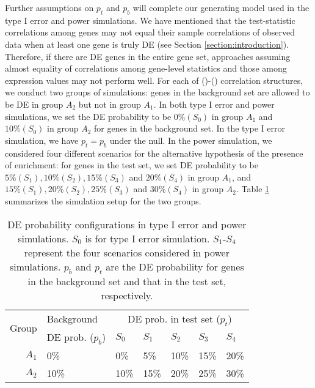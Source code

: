 	Further assumptions on $p_t$ and $p_b$ will complete our generating model used in the type I 
	error and power simulations. %
	We have mentioned that the test-statistic correlations among genes may not equal their sample 
	correlations of observed data when at least one gene is truly DE (see Section 
	\ref{section:introduction}). Therefore, if there are DE genes in the entire gene set, 
	approaches assuming	almost equality of correlations among gene-level statistics and those 
	among expression values may not perform well. For each of (\aaCase)-(\fCase) correlation 
	structures, we conduct two groups of simulations: genes in the background set are allowed to be 
	DE in group $A_2$ but not in group $A_1$.  In both type I error and power 
	simulations, we set the DE probability to be $0\%(S_0)$ in group $A_1$ and $10\%(S_0)$ in group 
	$A_2$ for genes in the background set. In the type I error simulation, we have $p_t = p_b$ 
	under the null. In the power simulation, we considered four different scenarios for the 
	alternative hypothesis of the presence of enrichment: for genes in the test set, we set DE
	probability to be $5\% (S_1), 10\%(S_2), 15\%(S_3)$ and $20\%(S_4)$ in group $A_1$, and 
	$15\%(S_1),	20\%(S_2), 25\%(S_3)$ and $30\%(S_4)$ in group $A_2$. Table \ref{table:simusetup} 
	summarizes the simulation setup for the two groups.
	

	
	\begin{table}[!ht]
		\centering
		\caption[DE probability configurations in type I error and power simulations]{DE 
		probability configurations in type I error and power simulations. $S_0$ is for
			type I error simulation. $S_1$-$S_4$ represent the four scenarios considered in power 
			simulations. $p_b$ and $p_t$ are the DE probability for genes in the background set and 
			that in the test set, respectively.}		
		\begin{tabular}{rp{3.7cm}p{1.5cm}p{1.5cm}p{1.5cm}p{1.5cm}p{1.5cm}}
			\hline
			\multirow{2}{*}{Group} & 	Background & \multicolumn{5}{c}{DE prob. in test set 
			($p_t$)}\\  \cline{3-7}
			&DE prob. ($p_b$)&$S_0$ &$S_1$ &$S_2$ &$S_3$ &$S_4$\\
		\hline
			$A_1$ & 0\% & 0\%  & 5\% & 10\% & 15\% & 20\%\\ 
			$A_2$ & 10\% & 10\% & 15\%& 20\%& 25\% & 30\%\\  
		\hline
		\end{tabular}	
		\label{table:simusetup}
	\end{table}
	
